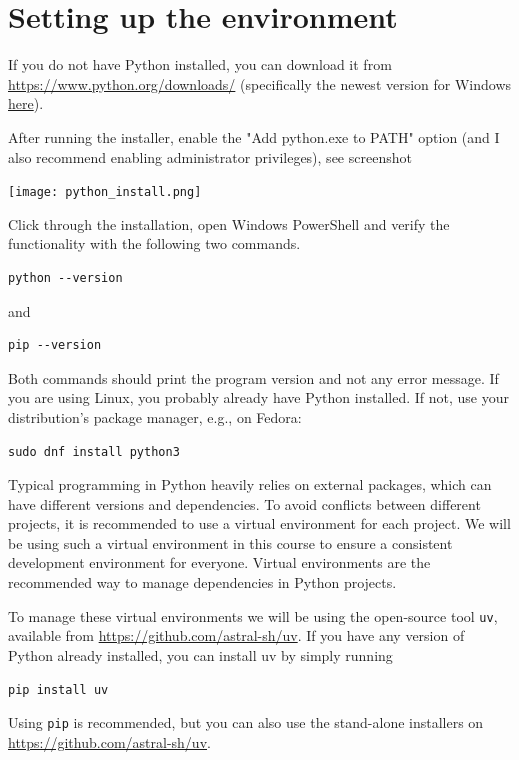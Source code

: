 \newpage
\section{Setting up the environment}

If you do not have Python installed, you can download it from \url{https://www.python.org/downloads/} (specifically the newest
version for Windows \href{https://www.python.org/ftp/python/3.13.7/python-3.13.7-amd64.exe}{here}).

After running the installer, enable the "Add python.exe to PATH" option (and I also recommend enabling administrator privileges), see screenshot
\begin{center}
    \texttt{[image: python\_install.png]}
\end{center}

Click through the installation, open Windows PowerShell and verify the functionality with the following two commands.

\begin{verbatim}
python --version
\end{verbatim}
and
\begin{verbatim}
pip --version
\end{verbatim}

Both commands should print the program version and not any error message. If you are using Linux, you probably already have Python installed. If not, use your distribution's package manager, e.g., on Fedora:
\begin{verbatim}
sudo dnf install python3
\end{verbatim}

Typical programming in Python heavily relies on external packages, which can have different versions and dependencies. To avoid conflicts between different projects, it is recommended to use a virtual environment for each project. We will be using such a virtual environment in this course to ensure a consistent development environment for everyone. Virtual environments are the recommended way to manage dependencies in Python projects.

To manage these virtual environments we will be using the open-source tool \verb|uv|, available from \url{https://github.com/astral-sh/uv}. If you have any version of Python already installed, you can install uv by simply running
\begin{lstlisting}
pip install uv
\end{lstlisting}
Using \verb|pip| is recommended, but you can also use the stand-alone installers on \url{https://github.com/astral-sh/uv}.

